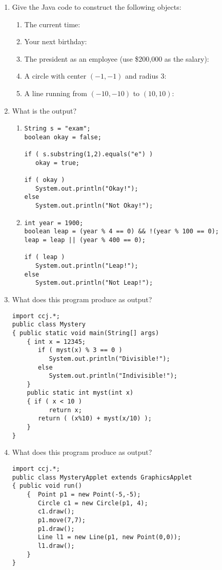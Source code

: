 \begin{enumerate}
    \item Give the Java code to construct the following objects:
	\begin{enumerate}
	    \item The current time:
	    \item Your next birthday:
	    \item The president as an employee (use \$200,000 as
		the salary):
	    \item A circle with center $(-1,-1)$ and radius $3$:
	    \item A line running from $(-10,-10)$ to $(10,10)$:
	\end{enumerate}

    \item What is the output? 
	\begin{enumerate}
	    \item 
\begin{verbatim}
String s = "exam";
boolean okay = false;

if ( s.substring(1,2).equals("e") )
   okay = true;

if ( okay )
   System.out.println("Okay!");
else
   System.out.println("Not Okay!");
\end{verbatim}

	    \item 
\begin{verbatim}
int year = 1900;
boolean leap = (year % 4 == 0) && !(year % 100 == 0);
leap = leap || (year % 400 == 0);

if ( leap )
   System.out.println("Leap!");
else
   System.out.println("Not Leap!");
\end{verbatim}
    \end{enumerate}




    \item What does this program produce as output?
\begin{verbatim}
import ccj.*;
public class Mystery
{ public static void main(String[] args)
    { int x = 12345;
       if ( myst(x) % 3 == 0 )
          System.out.println("Divisible!");
       else
          System.out.println("Indivisible!");
    }
    public static int myst(int x)
    { if ( x < 10 )
          return x;
       return ( (x%10) + myst(x/10) );
    }
}
\end{verbatim}


    \item What does this program produce as output?
\begin{verbatim}
import ccj.*;
public class MysteryApplet extends GraphicsApplet
{ public void run()
    {  Point p1 = new Point(-5,-5);
       Circle c1 = new Circle(p1, 4);
       c1.draw();
       p1.move(7,7);
       p1.draw(); 
       Line l1 = new Line(p1, new Point(0,0));
       l1.draw();
    }
}
\end{verbatim}


\end{enumerate}
